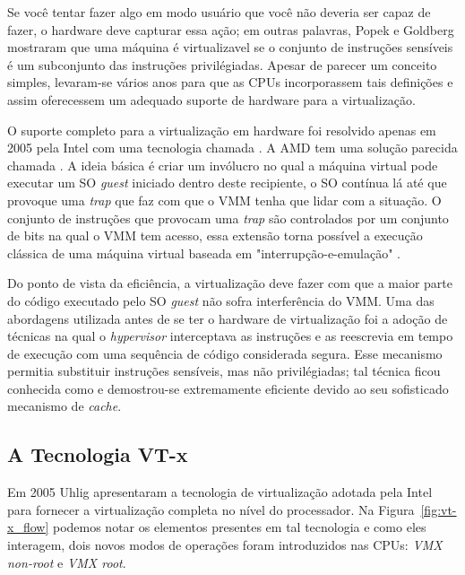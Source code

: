 Se você tentar fazer algo em modo usuário que você não deveria ser capaz de
fazer, o hardware deve capturar essa ação; em outras palavras, Popek e Goldberg
mostraram que uma máquina é virtualizavel se o conjunto de instruções sensíveis
é um subconjunto das instruções privilégiadas. Apesar de parecer um conceito
simples, levaram-se vários anos para que as CPUs incorporassem tais definições
e assim oferecessem um adequado suporte de hardware para a virtualização.

O suporte completo para a virtualização em hardware foi resolvido apenas em
2005 pela Intel \citep{uhlig} com uma tecnologia chamada . A AMD tem uma solução parecida chamada . A ideia básica é criar um invólucro no qual a máquina
virtual pode executar um SO \emph{guest} iniciado dentro deste recipiente, o SO
contínua lá até que provoque uma \emph{trap} que faz com que o VMM tenha que
lidar com a situação. O conjunto de instruções que provocam uma \emph{trap} são
controlados por um conjunto de bits na qual o VMM tem acesso, essa extensão
torna possível a execução clássica de uma máquina virtual baseada em
"interrupção-e-emulação" \citep{tanenbaum}.

Do ponto de vista da eficiência, a virtualização deve fazer com que a maior
parte do código executado pelo SO \emph{guest} não sofra interferência do VMM.
Uma das abordagens utilizada antes de se ter o hardware de virtualização foi a
adoção de técnicas na qual o \textit{hypervisor} interceptava as instruções e
as reescrevia em tempo de execução com uma sequência de código considerada
segura.
Esse mecanismo permitia substituir instruções sensíveis, mas não privilégiadas;
tal técnica ficou conhecida como  e demostrou-se
extremamente eficiente devido ao seu sofisticado mecanismo de \emph{cache}.


\subsection{A Tecnologia VT-x}
\label{sec:vtx}

Em 2005 Uhlig \citep{uhlig} apresentaram a tecnologia de virtualização adotada
pela Intel para fornecer a virtualização completa no nível do processador. Na
Figura~\ref{fig:vt-x_flow} podemos notar os elementos presentes em tal
tecnologia e como eles interagem, dois novos modos de operações foram
introduzidos nas CPUs: \emph{VMX non-root} e \emph{VMX root}.

